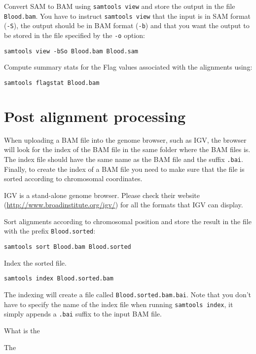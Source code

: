 \begin{steps}
Convert SAM to BAM using \texttt{samtools view} and store the output in the file
\texttt{Blood.bam}. You have to instruct \texttt{samtools view} that the input is in SAM
format (\texttt{-S}), the output should be in BAM format (\texttt{-b}) and that
you want the output to be stored in the file specified by the \texttt{-o}
option:

\begin{lstlisting}
samtools view -bSo Blood.bam Blood.sam
\end{lstlisting}
\end{steps}

\begin{advanced}
Compute summary stats for the Flag values associated with the alignments using:

\begin{lstlisting}
samtools flagstat Blood.bam
\end{lstlisting}
\end{advanced}

\section{Post alignment processing}

\begin{information}
When uploading a BAM file into the genome browser, such as IGV, the browser will look for the
index of the BAM file in the same folder where the BAM files is. The index file
should have the same name as the BAM file and the suffix \texttt{.bai}. Finally, to
create the index of a BAM file you need to make sure that the file is sorted
according to chromosomal coordinates.
\begin{note}
IGV is a stand-alone genome browser. Please check their website
(\url{http://www.broadinstitute.org/igv/}) for all the formats that IGV
can display. 
\end{note}

\end{information}


\begin{steps}
Sort alignments according to chromosomal position and store the result in the
file with the prefix \texttt{Blood.sorted}:

\begin{lstlisting}
samtools sort Blood.bam Blood.sorted
\end{lstlisting}

Index the sorted file.

\begin{lstlisting}
samtools index Blood.sorted.bam
\end{lstlisting}

The indexing will create a file called \texttt{Blood.sorted.bam.bai}. Note that
you don't have to specify the name of the index file when running
\texttt{samtools index}, it simply appends a \texttt{.bai} suffix to the input
BAM file.
\end{steps}


\begin{questions}
What is the 
\begin{answer}
The 
\end{answer}
\end{questions}




